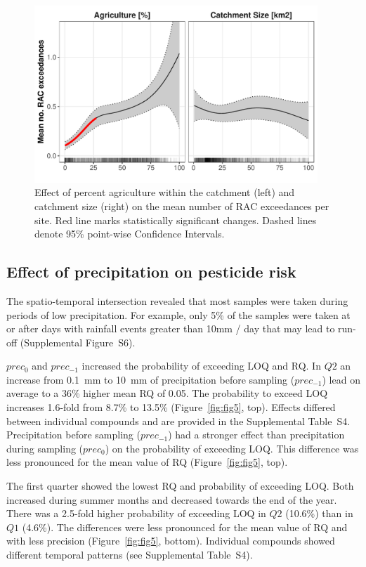 \documentclass[journal=esthag,manuscript=article]{achemso}
\begin{document}
\begin{figure}[ht]
  \includegraphics[width=0.95\textwidth]{figure4.pdf}
  \caption{Effect of percent agriculture within the catchment (left) and catchment size (right) on the mean number of RAC exceedances per site. Red line marks statistically significant changes. Dashed lines denote 95\% point-wise Confidence Intervals.
  }
  \label{fig:fig4}
\end{figure}


\subsection{Effect of precipitation on pesticide risk}
The spatio-temporal intersection revealed that most samples were taken during periods of low precipitation.
For example, only 5\% of the samples were taken at or after days with rainfall events greater than 10mm / day that may lead to run-off (Supplemental Figure~S6). 

$prec_{0}$ and $prec_{-1}$ increased the probability of exceeding LOQ and RQ.
In $Q2$ an increase from 0.1~mm to 10~mm of precipitation before sampling ($prec_{-1}$) lead on average to a 36\% higher mean RQ of 0.05.
The probability to exceed LOQ increases 1.6-fold from 8.7\% to 13.5\% (Figure~\ref{fig:fig5}, top). %
Effects differed between individual compounds and are provided in the Supplemental Table~S4. 
Precipitation before sampling ($prec_{-1}$) had a stronger effect than precipitation during sampling ($prec_{0}$) on the probability of exceeding LOQ. 
This difference was less pronounced for the mean value of RQ (Figure~\ref{fig:fig5}, top). 

The first quarter showed the lowest RQ and probability of exceeding LOQ.
Both increased during summer months and decreased towards the end of the year.
There was a 2.5-fold higher probability of exceeding LOQ in $Q2$ (10.6\%) than in $Q1$ (4.6\%).
The differences were less pronounced for the mean value of RQ and with less precision (Figure~\ref{fig:fig5}, bottom). 
Individual compounds showed different temporal patterns (see Supplemental Table~S4). 
\end{document}
